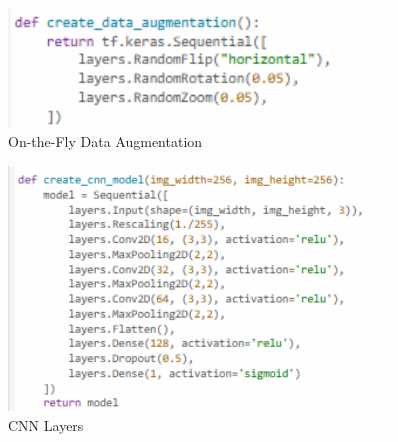\begin{figure}[!htbp]
	\centering
	\includegraphics[width=0.9\textwidth, angle=0]{figures/live_augmentation.png}
	\caption{On-the-Fly Data Augmentation}
\end{figure}

\begin{figure}[!htbp]
	\centering
	\includegraphics[width=0.9\textwidth, angle=0]{figures/CNN_layers.png}
	\caption{CNN Layers}
\end{figure}
